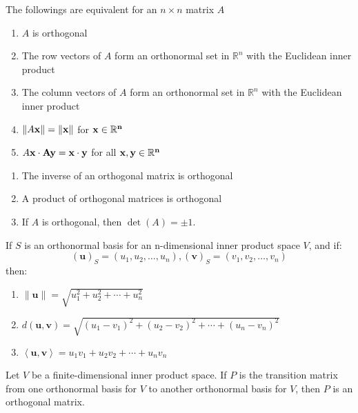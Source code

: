 \documentclass{report}
\begin{document}
		\begin{thm}
			The followings are equivalent for an $n \times n$ matrix $A$
			\begin{enumerate}
				\item $A$ is orthogonal
				\item The row vectors of $A$ form an orthonormal set in $\mathbb{R}^n$ with the Euclidean inner product
				\item The column vectors of $A$ form an orthonormal set in $\mathbb{R}^n$ with the Euclidean inner product
				\item $\|A\bf{x}\|=\|\bf{x}\|$ for $\bf{x} \in \mathbb{R}^n$
				\item $A\bf{x} \cdot A\bf{y} = \bf{x} \cdot \bf{y}$ for all $\bf{x}, \bf{y} \in \mathbb{R}^n$
			\end{enumerate}
		\end{thm}
		
		\begin{thm}
			\begin{enumerate}
				\item The inverse of an orthogonal matrix is orthogonal
				\item A product of orthogonal matrices is orthogonal
				\item If $A$ is orthogonal, then $\det(A)=\pm 1$.
			\end{enumerate}
		\end{thm}
		
		\begin{thm}
			If $S$ is an orthonormal basis for an n-dimensional inner product space $V$, and if:
			\begin{displaymath}
				(\bm{u})_S=(u_1,u_2,\dots,u_n), (\bm{v})_S=(v_1,v_2,\dots,v_n)
			\end{displaymath}
			then:
			\begin{enumerate}
				\item $\|\bm{u}\|=\sqrt{u_1^2+u_2^2+\cdots+u_n^2}$
				\item $d(\bm{u},\bm{v})=\sqrt{(u_1-v_1)^2+(u_2-v_2)^2+\cdots+(u_n-v_n)^2}$
				\item $\left<\bm{u},\bm{v}\right>=u_1v_1+u_2v_2+\cdots+u_nv_n$
			\end{enumerate}
		\end{thm}
		
		\begin{thm}
			Let $V$ be a finite-dimensional inner product space. If $P$ is the transition matrix from one orthonormal basis for $V$ to another orthonormal basis for $V$, then $P$ is an orthogonal matrix.
		\end{thm}
		
\end{document}
